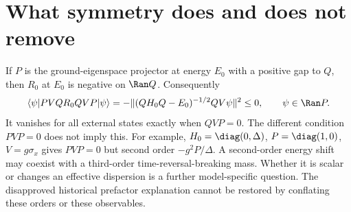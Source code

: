 \section{What symmetry does and does not remove}
If $P$ is the ground-eigenspace projector at energy $E_0$ with a positive gap
to $Q$, then $R_0$ at $E_0$ is negative on $\Ran Q$. Consequently
\begin{equation}
 \langle\psi|PVQ R_0 QVP|\psi\rangle
 =-\|(QH_0Q-E_0)^{-1/2}QV\psi\|^2\leq0,
 \qquad \psi\in\Ran P.
 \label{eq:narr:second_order}
\end{equation}
It vanishes for all external states exactly when $QVP=0$. The different
condition $PVP=0$ does not imply this. For example,
$H_0=\diag(0,\Delta)$, $P=\diag(1,0)$, $V=g\sigma_x$ gives
$PVP=0$ but second order $-g^2P/\Delta$.
A second-order energy shift may coexist with a third-order time-reversal-breaking
mass. Whether it is scalar or changes an effective dispersion is a further
model-specific question. The disapproved historical prefactor explanation
cannot be restored by conflating these orders or these observables.
